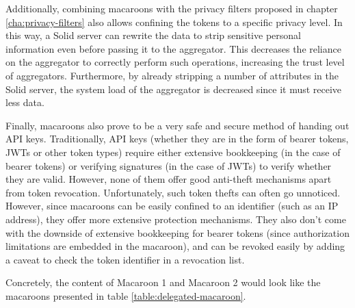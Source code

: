Additionally, combining macaroons with the privacy filters proposed in chapter \ref{cha:privacy-filters} also allows confining the tokens to a specific privacy level. In this way, a Solid server can rewrite the data to strip sensitive personal information even before passing it to the aggregator. This decreases the reliance on the aggregator to correctly perform such operations, increasing the trust level of aggregators. Furthermore, by already stripping a number of attributes in the Solid server, the system load of the aggregator is decreased since it must receive less data.

Finally, macaroons also prove to be a very safe and secure method of handing out API keys. Traditionally, API keys (whether they are in the form of bearer tokens, \gls{JWT}s or other token types) require either extensive bookkeeping (in the case of bearer tokens) or verifying signatures (in the case of \gls{JWT}s) to verify whether they are valid. However, none of them offer good anti-theft mechanisms apart from token revocation. Unfortunately, such token thefts can often go unnoticed. However, since macaroons can be easily confined to an identifier (such as an IP address), they offer more extensive protection mechanisms. They also don't come with the downside of extensive bookkeeping for bearer tokens (since authorization limitations are embedded in the macaroon), and can be revoked easily by adding a caveat to check the token identifier in a revocation list.

Concretely, the content of Macaroon 1 and Macaroon 2 would look like the macaroons presented in table \ref{table:delegated-macaroon}.

